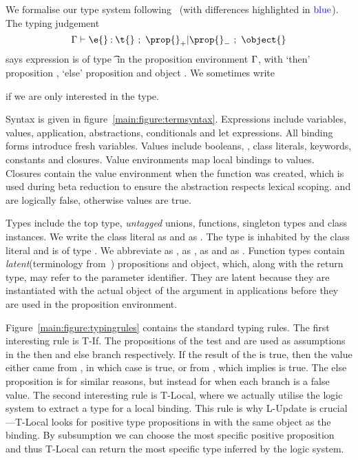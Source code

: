 We formalise our type system following~\citet{TF10}
(with differences highlighted in $\mathbin{\textcolor{blue}{\text{blue}}}$).
The typing judgement 
$$
{\judgement   {\propenv}
              {\hastype {\e{}} {\t{}}}
  {\filterset {\thenprop {\prop{}}}
              {\elseprop {\prop{}}}}
  {\object{}}}
$$
says expression \e{} is of type \t{} in the 
proposition environment $\Gamma{}$, with 
`then' proposition {\thenprop {\prop{}}}, `else' proposition {\elseprop {\prop{}}}
and object \object{}. We sometimes write 
{\judgementtwo{\propenv}{\hastype {\e{}} {\t{}}} if we are only interested in the type.

Syntax is given in figure~\ref{main:figure:termsyntax}. Expressions include variables, values,
application, abstractions, conditionals and let expressions.
All binding forms introduce fresh variables.
Values include booleans, \nil{}, class literals, keywords, 
constants and closures. 
Value environments map local bindings to values.
Closures contain the value environment \openv{} when the function was created,
which is used during beta reduction to ensure the abstraction respects lexical scoping.
\false{} and \nil{} are logically false, otherwise values are true.

Types include the top type, \emph{untagged} unions, functions, singleton types
and class instances. 
We write the class literal \Booleanlong{} as \Boolean{} and \Keywordlong{} as \Keyword{}.
The type \Value{\Keyword} is inhabited by the class literal \Keyword{} and  is of type \Keyword{}.
We abbreviate \EmptyUnion{} as \Bot{}, {\ValueNil} as \Nil{}, 
{\ValueTrue} as \True and {\ValueFalse} as {\False}.
Function types contain \emph{latent}(terminology from~\cite{Lucassen88polymorphiceffect}) propositions and object, which, along with the return type,
may refer to the parameter identifier. They are latent because they are instantiated with the
actual object of the argument in applications before they are used in the proposition environment.

Figure~\ref{main:figure:typingrules} contains the standard typing rules.
The first interesting rule is T-If. The propositions of the test  and 
are used as assumptions in the then and else branch respectively.
If the result of the \ifliteral{} is true, then the value either
came from , in which case  is true, or from ,
which implies  is true. 
The else proposition is  for
similar reasons, but instead for when each branch is a false value.
The second interesting rule is T-Local, where we actually utilise the logic system
to extract a type for a local binding. This rule is why L-Update is crucial---T-Local
looks for positive type propositions in \propenv{} with the same object as the binding.
By subsumption we can choose the most specific positive proposition and thus
T-Local can return the most specific type inferred by the logic system.

}
